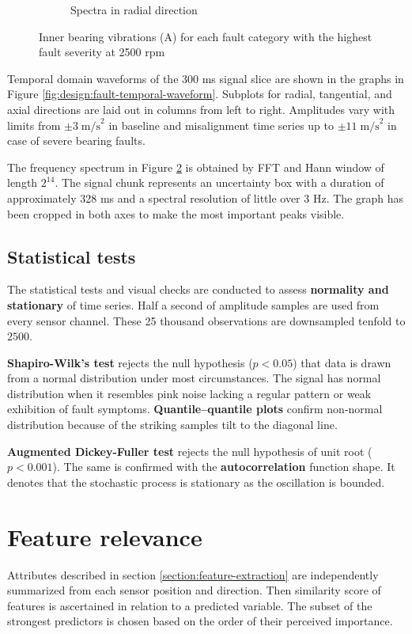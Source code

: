 \begin{figure}[ht]
\begin{subfigure}[b]{0.55\textwidth}
        \caption{Spectra in radial direction}
        \label{fig:design:fault-spectral-waveform}
    \end{subfigure} 
    \caption{Inner bearing vibrations (A) for each fault category with the highest fault severity at 2500 rpm}
\end{figure}

Temporal domain waveforms of the 300 ms signal slice are shown in the graphs in Figure \ref{fig:design:fault-temporal-waveform}. Subplots for radial, tangential, and axial directions are laid out in columns from left to right. Amplitudes vary with limits from $\pm 3\; \mathrm{m/s}^2$ in baseline and misalignment time series up to $\pm 11\;\mathrm{m/s}^2$ in case of severe bearing faults. 

The frequency spectrum in Figure \ref{fig:design:fault-spectral-waveform} is obtained by FFT and Hann window of length $2^{14}$. The signal chunk represents an uncertainty box with a duration of approximately 328 ms and a spectral resolution of little over 3 Hz. The graph has been cropped in both axes to make the most important peaks visible.


\subsection{Statistical tests}
The statistical tests and visual checks are conducted to assess \textbf{normality and stationary} of time series. Half a second of amplitude samples are used from every sensor channel. These 25 thousand observations are downsampled tenfold to $2500$. 

\textbf{Shapiro-Wilk's test} rejects the null hypothesis (${p < 0.05}$) that data is drawn from a normal distribution under most circumstances. The signal has normal distribution when it resembles pink noise lacking a regular pattern or weak exhibition of fault symptoms. \textbf{Quantile–quantile plots} confirm non-normal distribution because of the striking samples tilt to the diagonal line.

\textbf{Augmented Dickey-Fuller test} rejects the null hypothesis of unit root (${p < 0.001}$). The same is confirmed with the \textbf{autocorrelation} function shape. It denotes that the stochastic process is stationary as the oscillation is bounded.

\section{Feature relevance}
Attributes described in section \ref{section:feature-extraction} are independently summarized from each sensor position and direction. Then similarity score of features is ascertained in relation to a predicted variable. The subset of the strongest predictors is chosen based on the order of their perceived importance.

